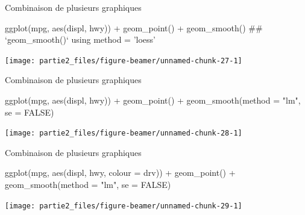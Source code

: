 \documentclass[12pt,ignorenonframetext,]{beamer}
\newenvironment{Shaded}{}{}
\newcommand{\DataTypeTok}[1]{#1}
\newcommand{\KeywordTok}[1]{\textcolor[rgb]{0.00,0.00,1.00}{#1}}
\newcommand{\NormalTok}[1]{#1}
\newcommand{\OperatorTok}[1]{#1}
\newcommand{\OtherTok}[1]{\textcolor[rgb]{1.00,0.25,0.00}{#1}}
\newcommand{\StringTok}[1]{\textcolor[rgb]{0.00,0.50,0.50}{#1}}
\renewenvironment{Shaded}{\begin{snugshade}}{\end{snugshade}}
\begin{document}
\begin{frame}[fragile]{Combinaison de plusieurs graphiques}
\protect\hypertarget{combinaison-de-plusieurs-graphiques-2}{}

\footnotesize \center

\begin{Shaded}
\begin{Highlighting}[]
\KeywordTok{ggplot}\NormalTok{(mpg, }\KeywordTok{aes}\NormalTok{(displ, hwy)) }\OperatorTok{+}
\StringTok{  }\KeywordTok{geom_point}\NormalTok{() }\OperatorTok{+}\StringTok{ }\KeywordTok{geom_smooth}\NormalTok{()}
\NormalTok{  ## `geom_smooth()` using method = 'loess'}
\end{Highlighting}
\end{Shaded}

\texttt{[image: partie2\_files/figure-beamer/unnamed-chunk-27-1]}

\end{frame}

\begin{frame}[fragile]{Combinaison de plusieurs graphiques}
\protect\hypertarget{combinaison-de-plusieurs-graphiques-3}{}

\footnotesize \center

\begin{Shaded}
\begin{Highlighting}[]
\KeywordTok{ggplot}\NormalTok{(mpg, }\KeywordTok{aes}\NormalTok{(displ, hwy)) }\OperatorTok{+}
\StringTok{  }\KeywordTok{geom_point}\NormalTok{() }\OperatorTok{+}\StringTok{ }\KeywordTok{geom_smooth}\NormalTok{(}\DataTypeTok{method =} \StringTok{"lm"}\NormalTok{, }\DataTypeTok{se =} \OtherTok{FALSE}\NormalTok{)}
\end{Highlighting}
\end{Shaded}

\texttt{[image: partie2\_files/figure-beamer/unnamed-chunk-28-1]}

\end{frame}

\begin{frame}[fragile]{Combinaison de plusieurs graphiques}
\protect\hypertarget{combinaison-de-plusieurs-graphiques-4}{}

\footnotesize \center

\begin{Shaded}
\begin{Highlighting}[]
\KeywordTok{ggplot}\NormalTok{(mpg, }\KeywordTok{aes}\NormalTok{(displ, hwy, }\DataTypeTok{colour =}\NormalTok{ drv)) }\OperatorTok{+}
\StringTok{  }\KeywordTok{geom_point}\NormalTok{() }\OperatorTok{+}\StringTok{ }\KeywordTok{geom_smooth}\NormalTok{(}\DataTypeTok{method =} \StringTok{"lm"}\NormalTok{, }\DataTypeTok{se =} \OtherTok{FALSE}\NormalTok{)}
\end{Highlighting}
\end{Shaded}

\texttt{[image: partie2\_files/figure-beamer/unnamed-chunk-29-1]}

\end{frame}
\end{document}
